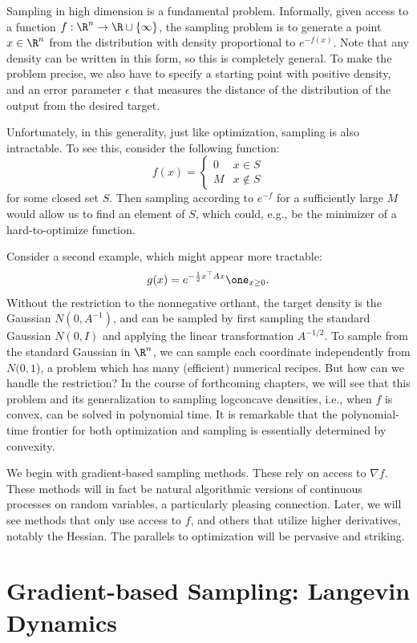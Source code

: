 Sampling in high dimension is a fundamental problem. Informally, given
access to a function $f:\R^{n}\rightarrow\R\cup\left\{ \infty\right\} $,
the sampling problem is to generate a point $x\in\R^{n}$ from the
distribution with density proportional to $e^{-f(x)}$. Note that
any density can be written in this form, so this is completely general.
To make the problem precise, we also have to specify a starting point
with positive density, and an error parameter $\epsilon$ that measures
the distance of the distribution of the output from the desired target. 

Unfortunately, in this generality, just like optimization, sampling
is also intractable. To see this, consider the following function:
\[
f(x)=\begin{cases}
0 & x\in S\\
M & x\not\in S
\end{cases}
\]
for some closed set $S$. Then sampling according to $e^{-f}$ for
a sufficiently large $M$ would allow us to find an element of $S$,
which could, e.g., be the minimizer of a hard-to-optimize function.

Consider a second example, which might appear more tractable: 
\[
g(x)=e^{-\frac{1}{2}x^{\top}Ax}\one_{x\ge0}.
\]
Without the restriction to the nonnegative orthant, the target density
is the Gaussian $N(0,A^{-1})$, and can be sampled by first sampling
the standard Gaussian $N(0,I)$ and applying the linear transformation
$A^{-1/2}$. To sample from the standard Gaussian in $\R^{n}$, we
can sample each coordinate independently from $N(0,1$), a problem
which has many (efficient) numerical recipes. But how can we handle
the restriction? In the course of forthcoming chapters, we will see
that this problem and its generalization to sampling logconcave densities,
i.e., when $f$ is convex, can be solved in polynomial time. It is
remarkable that the polynomial-time frontier for both optimization
and sampling is essentially determined by convexity.

We begin with gradient-based sampling methods. These rely on access
to $\nabla f$. These methods will in fact be natural algorithmic
versions of continuous processes on random variables, a particularly
pleasing connection. Later, we will see methods that only use access
to $f$, and others that utilize higher derivatives, notably the Hessian.
The parallels to optimization will be pervasive and striking.

\section{Gradient-based Sampling: Langevin Dynamics}

